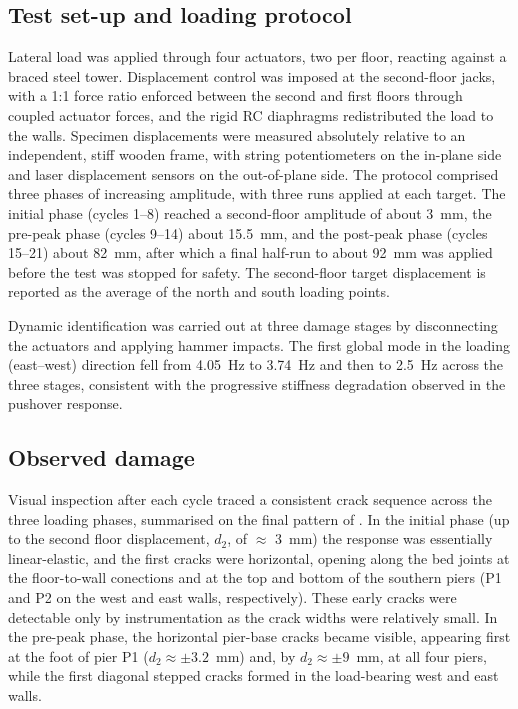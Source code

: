 \documentclass[AMA,twocolumn]{USG} %
\begin{document}
\subsection{Test set-up and loading protocol}
Lateral load was applied through four actuators, two per floor, reacting against a braced steel tower.
Displacement control was imposed at the second-floor jacks, with a 1:1 force ratio enforced between the second and first floors through coupled actuator forces, and the rigid RC diaphragms redistributed the load to the walls.
Specimen displacements were measured absolutely relative to an independent, stiff wooden frame, with string potentiometers on the in-plane side and laser displacement sensors on the out-of-plane side.
The protocol comprised three phases of increasing amplitude, with three runs applied at each target. 
The initial phase (cycles 1--8) reached a second-floor amplitude of about \qty{3}{\milli\meter}, the pre-peak phase (cycles 9--14) about \qty{15.5}{\milli\meter}, and the post-peak phase (cycles 15--21) about \qty{82}{\milli\meter}, after which a final half-run to about \qty{92}{\milli\meter} was applied before the test was stopped for safety. 
The second-floor target displacement is reported as the average of the north and south loading points.

Dynamic identification was carried out at three damage stages by disconnecting the actuators and applying hammer impacts. 
The first global mode in the loading (east--west) direction fell from \qty{4.05}{\hertz} to \qty{3.74}{\hertz} and then to \qty{2.5}{\hertz} across the three stages, consistent with the progressive stiffness degradation observed in the pushover response.

\subsection{Observed damage}
Visual inspection after each cycle traced a consistent crack sequence across the three loading phases, summarised on the final pattern of .
In the initial phase (up to the second floor displacement, $d_2$, of $\approx$ \qty{3}{\milli\meter}) the response was essentially linear-elastic, and the first cracks were horizontal, opening along the bed joints at the floor-to-wall conections and at the top and bottom of the southern piers (P1 and P2 on the west and east walls, respectively).
These early cracks were detectable only by instrumentation as the crack widths were relatively small.
In the pre-peak phase, the horizontal pier-base cracks became visible, appearing first at the foot of pier P1 ($d_2 \approx \pm 3.2$~mm) and, by $d_2 \approx \pm 9$~mm, at all four piers, while the first diagonal stepped cracks formed in the load-bearing west and east walls.
\end{document}
